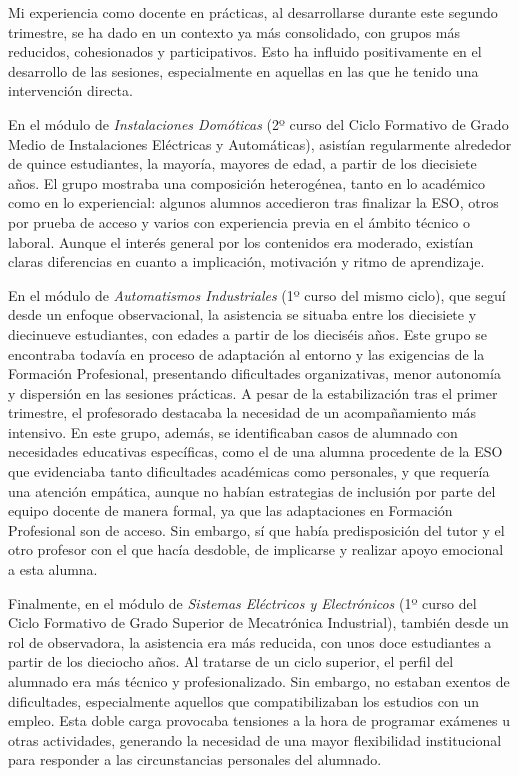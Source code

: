 Mi experiencia como docente en prácticas, al desarrollarse durante este segundo trimestre, se ha dado en un contexto ya más consolidado, con grupos más reducidos, cohesionados y participativos. Esto ha influido positivamente en el desarrollo de las sesiones, especialmente en aquellas en las que he tenido una intervención directa.

En el módulo de \textit{Instalaciones Domóticas} (2º curso del Ciclo Formativo de Grado Medio de Instalaciones Eléctricas y Automáticas), asistían regularmente alrededor de quince estudiantes, la mayoría, mayores de edad, a partir de los diecisiete años. El grupo mostraba una composición heterogénea, tanto en lo académico como en lo experiencial: algunos alumnos accedieron tras finalizar la ESO, otros por prueba de acceso y varios con experiencia previa en el ámbito técnico o laboral. Aunque el interés general por los contenidos era moderado, existían claras diferencias en cuanto a implicación, motivación y ritmo de aprendizaje.

En el módulo de \textit{Automatismos Industriales} (1º curso del mismo ciclo), que seguí desde un enfoque observacional, la asistencia se situaba entre los diecisiete y diecinueve estudiantes, con edades a partir de los dieciséis años. Este grupo se encontraba todavía en proceso de adaptación al entorno y las exigencias de la Formación Profesional, presentando dificultades organizativas, menor autonomía y dispersión en las sesiones prácticas. A pesar de la estabilización tras el primer trimestre, el profesorado destacaba la necesidad de un acompañamiento más intensivo. En este grupo, además, se identificaban casos de alumnado con necesidades educativas específicas, como el de una alumna procedente de la ESO que evidenciaba tanto dificultades académicas como personales, y que requería una atención empática, aunque no habían estrategias de inclusión por parte del equipo docente de manera formal, ya que las adaptaciones en Formación Profesional son de acceso. Sin embargo, sí que había predisposición del tutor y el otro profesor con el que hacía desdoble, de implicarse y realizar apoyo emocional a esta alumna.

Finalmente, en el módulo de \textit{Sistemas Eléctricos y Electrónicos} (1º curso del Ciclo Formativo de Grado Superior de Mecatrónica Industrial), también desde un rol de observadora, la asistencia era más reducida, con unos doce estudiantes a partir de los dieciocho años. Al tratarse de un ciclo superior, el perfil del alumnado era más técnico y profesionalizado. Sin embargo, no estaban exentos de dificultades, especialmente aquellos que compatibilizaban los estudios con un empleo. Esta doble carga provocaba tensiones a la hora de programar exámenes u otras actividades, generando la necesidad de una mayor flexibilidad institucional para responder a las circunstancias personales del alumnado.

